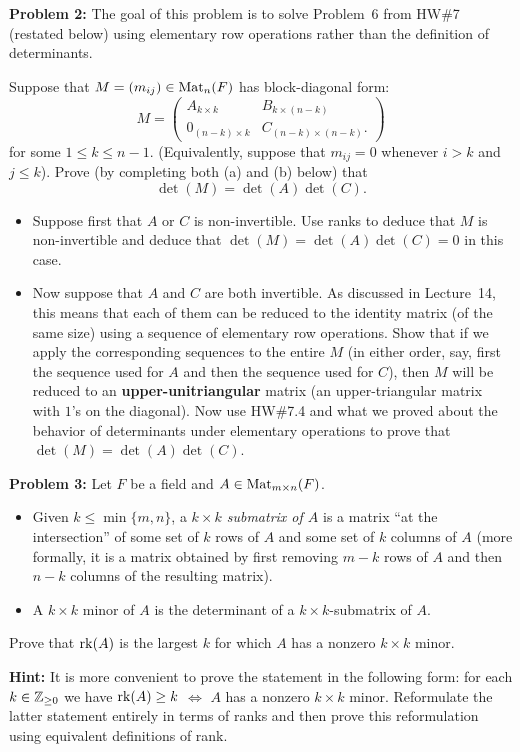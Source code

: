 \documentclass[11pt]{amsart}
\begin{document}
\skv

{\bf Problem 2: } The goal of this problem is to solve Problem~6 from HW\#7 (restated below) using elementary row operations rather than the definition of determinants. 

Suppose that $M=(m_{ij})\in {\rm Mat}_{n}(F)$ has block-diagonal form:
$$M=\begin{pmatrix} A_{k\times k} &B_{k\times (n-k)} \\ 0_{(n-k)\times k} & 
C_{(n-k)\times (n-k)}.
\end{pmatrix}$$
for some $1\leq k\leq n-1$. (Equivalently, suppose that $m_{ij}=0$ whenever $i>k$ and $j\leq k$).
Prove (by completing both (a) and (b) below) that $$\det(M)=\det(A)\det(C).$$

\begin{itemize}
\item[(a)] Suppose first that $A$ or $C$ is non-invertible. Use ranks to deduce that $M$ is non-invertible and deduce that
$\det(M)=\det(A)\det(C)=0$ in this case.
\item[(b)] Now suppose that $A$ and $C$ are both invertible. As discussed in Lecture~14, this means that each of them can be reduced to the identity matrix (of the same size) using a sequence of elementary row operations. Show that if we apply the corresponding sequences to the entire $M$
(in either order, say, first the sequence used for $A$ and then the sequence used for $C$), then $M$ will be reduced to an {\bf upper-unitriangular}
matrix (an upper-triangular matrix with $1$'s on the diagonal). Now use HW\#7.4 and what we proved about the behavior of determinants
under elementary operations to prove that $\det(M)=\det(A)\det(C)$.
\end{itemize}

{\bf Problem 3: } Let $F$ be a field and $A\in {\rm Mat}_{m\times n}(F)$.
\begin{itemize}
\item[(i)] Given $k\leq \min\{m,n\}$, a \emph{$k\times k$ submatrix of $A$} is a matrix ``at the intersection'' of some set of $k$ rows of $A$
and some set of $k$ columns of $A$ (more formally, it is a matrix obtained by first removing $m-k$ rows of $A$ and then $n-k$ columns of the resulting matrix).
\item[(ii)] A $k\times k$ minor of $A$ is the determinant of a $k\times k$-submatrix of $A$.
\end{itemize} 
Prove that ${\rm rk}(A)$ is the largest $k$ for which $A$ has a nonzero $k\times k$ minor. 

{\bf Hint:} It is more convenient to prove the statement
in the following form: for each $k\in {\mathbb Z}_{\geq 0}$ we have ${\rm rk}(A)\geq k$ $\iff$ $A$ has a nonzero $k\times k$ minor. Reformulate the latter
statement entirely in terms of ranks and then prove this reformulation using equivalent definitions of rank. 
\end{document}
